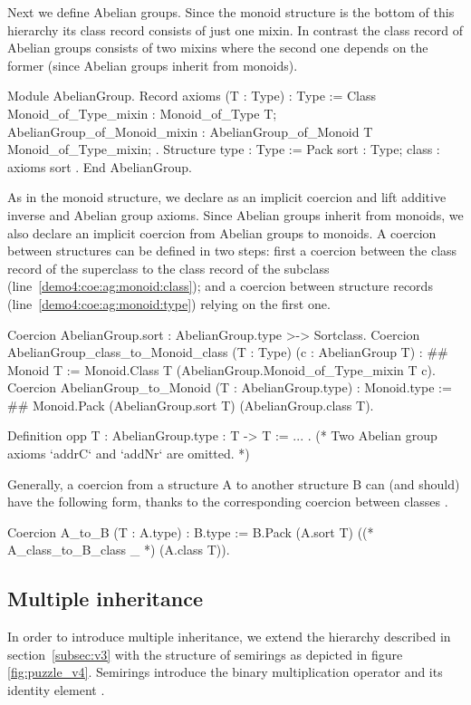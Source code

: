 \documentclass[a4paper,UKenglish,cleveref, autoref]{lipics-v2019}
\newcommand{\mixin}{mixin}
\newcommand{\mixins}{mixins}
\theoremstyle{implem}
\theoremstyle{implem}
\theoremstyle{command}
\begin{document}
Next we define Abelian groups.
Since the monoid structure is the bottom of this hierarchy its class record
 consists of just one \mixin{}. In contrast the class record
of Abelian groups consists of two \mixins{} where the second one depends
 on the former (since Abelian groups inherit from monoids).
\begin{coqcode}
Module AbelianGroup.
Record axioms (T : Type) : Type := Class {
  Monoid_of_Type_mixin : Monoid_of_Type T;
  AbelianGroup_of_Monoid_mixin : AbelianGroup_of_Monoid T Monoid_of_Type_mixin; }.
Structure type : Type := Pack { sort : Type; class : axioms sort }.
End AbelianGroup.
\end{coqcode}
As in the monoid structure, we declare  as an implicit
coercion and lift additive inverse  and Abelian group axioms.
Since Abelian groups inherit from monoids, we also declare an implicit coercion
from Abelian groups to monoids. A coercion between structures can be defined
in two steps: first a coercion between the class record of the
superclass to the class record of the subclass (line~\ref{demo4:coe:ag:monoid:class});
and a coercion between
structure records (line~\ref{demo4:coe:ag:monoid:type}) relying on the first one.
\begin{coqcode}
Coercion AbelianGroup.sort : AbelianGroup.type >-> Sortclass.
Coercion AbelianGroup_class_to_Monoid_class (T : Type) (c : AbelianGroup T) : #\label{demo4:coe:ag:monoid:class}#
  Monoid T := Monoid.Class T (AbelianGroup.Monoid_of_Type_mixin T c).
Coercion AbelianGroup_to_Monoid (T : AbelianGroup.type) : Monoid.type := #\label{demo4:coe:ag:monoid:type}#
  Monoid.Pack (AbelianGroup.sort T) (AbelianGroup.class T).

Definition opp {T : AbelianGroup.type} : T -> T := ... .
(* Two Abelian group axioms `addrC` and `addNr` are omitted. *)
\end{coqcode}

Generally, a coercion from a structure A to another structure B can (and should) have the following form, thanks to the corresponding coercion between classes .
\begin{coqcode}
Coercion A_to_B (T : A.type) : B.type :=
  B.Pack (A.sort T) ((* A_class_to_B_class _ *) (A.class T)).
\end{coqcode}

\subsection{Multiple inheritance}
In order to introduce multiple inheritance, we extend the hierarchy described in
section~\ref{subsec:v3} with the structure of semirings %
as depicted in figure \ref{fig:puzzle_v4}. Semirings introduce the binary
multiplication operator  and its identity element .
\end{document}
